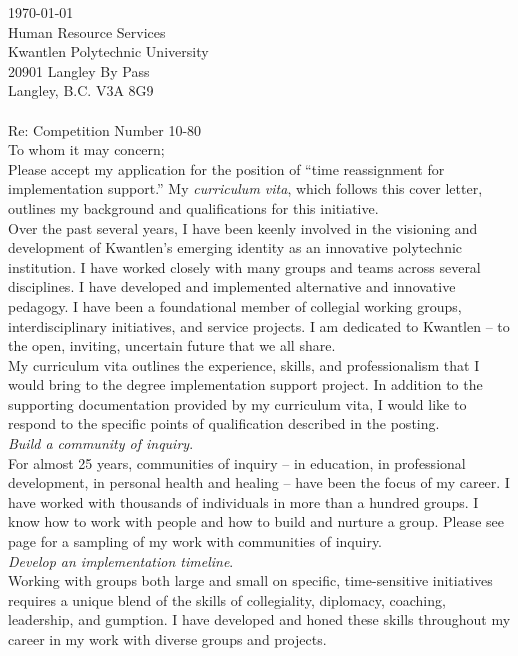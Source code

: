 \documentclass[10pt, a4paper]{article}
\begin{document}
\today\vspace{1em}\\
Human Resource Services\\
Kwantlen Polytechnic University\\
20901 Langley By Pass\\
Langley, B.C. V3A 8G9\\
\href{employ@kwantlen.ca}\\

Re: Competition Number 10-80\\

To whom it may concern;\\

Please accept my application for the position of ``time reassignment for implementation support.'' My \textit{curriculum vita}, which follows this cover letter, outlines my background and qualifications for this initiative.\\

Over the past several years, I have been keenly involved in the visioning and development of Kwantlen's emerging identity as an innovative polytechnic institution. I have worked closely with many groups and teams across several disciplines. I have developed and implemented alternative and innovative pedagogy. I have been a foundational member of collegial working groups, interdisciplinary initiatives, and service projects. I am dedicated to Kwantlen -- to the open, inviting, uncertain future that we all share.\\

My curriculum vita outlines the experience, skills, and professionalism that I would bring to the degree implementation support project. In addition to the supporting documentation provided by my curriculum vita, I would like to respond to the specific points of qualification described in the posting.\\

\textit{Build a community of inquiry}.\\
For almost 25 years, communities of inquiry -- in education, in professional development, in personal health and healing -- have been the focus of my career. I have worked with thousands of individuals in more than a hundred groups. I know how to work with people and how to build and nurture a group. Please see page \pageref{sample_consulting} for a sampling of my work with communities of inquiry.\\

\textit{Develop an implementation timeline}.\\
Working with groups both large and small on specific, time-sensitive initiatives requires a unique blend of the skills of collegiality, diplomacy, coaching, leadership, and gumption. I have developed and honed these skills throughout my career in my work with diverse groups and projects.\\
\end{document}
